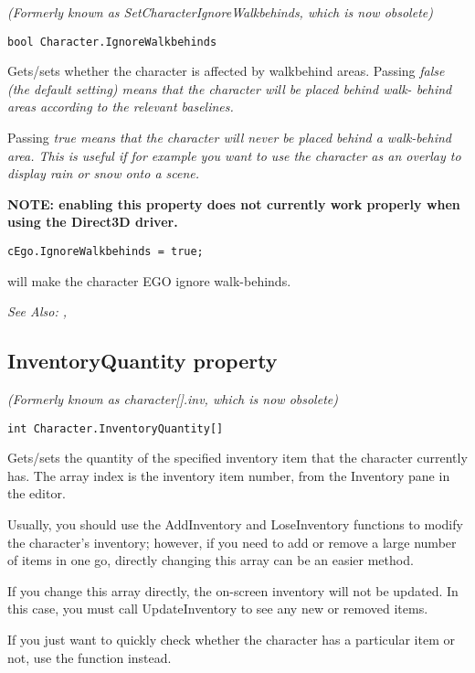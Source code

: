\it{(Formerly known as SetCharacterIgnoreWalkbehinds, which is now obsolete)}

\begin{verbatim}
bool Character.IgnoreWalkbehinds
\end{verbatim}
Gets/sets whether the character is affected by walkbehind areas. Passing \it{false}
(the default setting) means that the character will be placed behind walk-
behind areas according to the relevant baselines.

Passing \it{true} means that the character will never be placed behind a walk-behind
area. This is useful if for example you want to use the character as an
overlay to display rain or snow onto a scene.

\bf{NOTE:} enabling this property does not currently work properly when using
the Direct3D driver.

\begin{verbatim}
cEgo.IgnoreWalkbehinds = true;
\end{verbatim}
will make the character EGO ignore walk-behinds.

\it{See Also:} ,


\subsection{InventoryQuantity property}\label{Character.InventoryQuantity}%

\it{(Formerly known as character[].inv, which is now obsolete)}

\begin{verbatim}
int Character.InventoryQuantity[]
\end{verbatim}
Gets/sets the quantity of the specified inventory item that the character currently has.
The array index is the inventory item number, from the Inventory pane in the editor.

Usually, you should use the AddInventory and LoseInventory functions to modify the
character's inventory; however, if you need to add or remove a large number of items
in one go, directly changing this array can be an easier method.

If you change this array directly, the on-screen inventory will not be updated. In this
case, you must call UpdateInventory to see any new or removed items.

If you just want to quickly check whether the character has a particular item or
not, use the  function instead.

